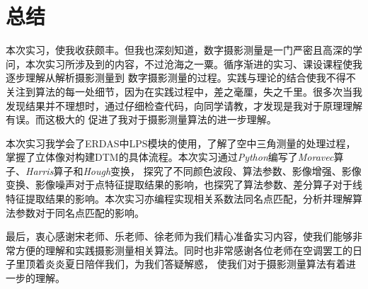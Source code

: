 \section{总结}
    本次实习，使我收获颇丰。但我也深刻知道，数字摄影测量是一门严密且高深的学问，本次实习所涉及到的内容，不过沧海之一粟。循序渐进的实习、课设课程使我逐步理解从解析摄影测量到
    数字摄影测量的过程。实践与理论的结合使我不得不关注到算法的每一处细节，因为在实践过程中，差之毫厘，失之千里。很多次当我发现结果并不理想时，通过仔细检查代码，向同学请教，才发现是我对于原理理解有误。而这极大的
    促进了我对于摄影测量算法的进一步理解。

    本次实习我学会了ERDAS中LPS模块的使用，了解了空中三角测量的处理过程，掌握了立体像对构建DTM的具体流程。本次实习通过\textit{Python}编写了\textit{Moravec}算子、\textit{Harris}算子和\textit{Hough}变换，
    探究了不同颜色波段、算法参数、影像增强、影像变换、影像噪声对于点特征提取结果的影响，也探究了算法参数、差分算子对于线特征提取结果的影响。本次实习亦编程实现相关系数法同名点匹配，分析并理解算法参数对于同名点匹配的影响。
    
    最后，衷心感谢宋老师、乐老师、徐老师为我们精心准备实习内容，使我们能够非常方便的理解和实践摄影测量相关算法。同时也非常感谢各位老师在空调罢工的日子里顶着炎炎夏日陪伴我们，为我们答疑解惑，
    使我们对于摄影测量算法有着进一步的理解。